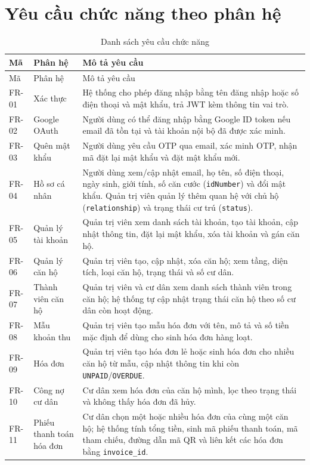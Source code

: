 ﻿\documentclass[12pt,a4paper]{report}
\begin{document}
\section{Yêu cầu chức năng theo phân hệ}
\begin{longtable}{L{1.4cm} L{3cm} L{9cm}}
\caption{Danh sách yêu cầu chức năng}\label{tab:functional}\\
\toprule
Mã & Phân hệ & Mô tả yêu cầu \\
\midrule
\endfirsthead
\toprule
Mã & Phân hệ & Mô tả yêu cầu \\
\midrule
\endhead
FR-01 & Xác thực & Hệ thống cho phép đăng nhập bằng tên đăng nhập hoặc số điện thoại và mật khẩu, trả JWT kèm thông tin vai trò. \\
FR-02 & Google OAuth & Người dùng có thể đăng nhập bằng Google ID token nếu email đã tồn tại và tài khoản nội bộ đã được xác minh. \\
FR-03 & Quên mật khẩu & Người dùng yêu cầu OTP qua email, xác minh OTP, nhận mã đặt lại mật khẩu và đặt mật khẩu mới. \\
FR-04 & Hồ sơ cá nhân & Người dùng xem/cập nhật email, họ tên, số điện thoại, ngày sinh, giới tính, số căn cước (\texttt{idNumber}) và đổi mật khẩu. Quản trị viên quản lý thêm quan hệ với chủ hộ (\texttt{relationship}) và trạng thái cư trú (\texttt{status}). \\
FR-05 & Quản lý tài khoản & Quản trị viên xem danh sách tài khoản, tạo tài khoản, cập nhật thông tin, đặt lại mật khẩu, xóa tài khoản và gán căn hộ. \\
FR-06 & Quản lý căn hộ & Quản trị viên tạo, cập nhật, xóa căn hộ; xem tầng, diện tích, loại căn hộ, trạng thái và số cư dân. \\
FR-07 & Thành viên căn hộ & Quản trị viên và cư dân xem danh sách thành viên trong căn hộ; hệ thống tự cập nhật trạng thái căn hộ theo số cư dân còn hoạt động. \\
FR-08 & Mẫu khoản thu & Quản trị viên tạo mẫu hóa đơn với tên, mô tả và số tiền mặc định để dùng cho sinh hóa đơn hàng loạt. \\
FR-09 & Hóa đơn & Quản trị viên tạo hóa đơn lẻ hoặc sinh hóa đơn cho nhiều căn hộ từ mẫu, cập nhật thông tin khi còn \texttt{UNPAID}/\texttt{OVERDUE}. \\
FR-10 & Công nợ cư dân & Cư dân xem hóa đơn của căn hộ mình, lọc theo trạng thái và không thấy hóa đơn đã hủy. \\
FR-11 & Phiếu thanh toán hóa đơn & Cư dân chọn một hoặc nhiều hóa đơn của cùng một căn hộ; hệ thống tính tổng tiền, sinh mã phiếu thanh toán, mã tham chiếu, đường dẫn mã QR và liên kết các hóa đơn bằng \texttt{invoice\_id}. \\

\end{longtable}
\end{document}
